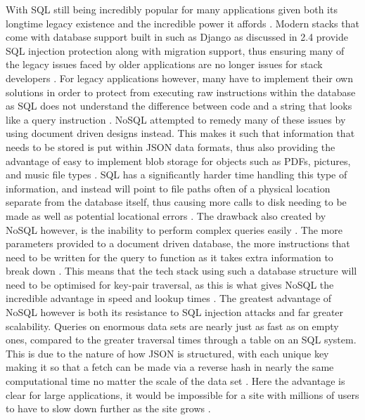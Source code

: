 With SQL still being incredibly popular for many applications given both its longtime legacy existence and the incredible power it affords \cite{Li_Manoharan_2013}. Modern stacks that come with database support built in such as Django as discussed in 2.4 provide SQL injection protection along with migration support, thus ensuring many of the legacy issues faced by older applications are no longer issues for stack developers \cite{Li_Manoharan_2013, Chen_Tang_Wang_Zhao_Guo_2016}. For legacy applications however, many have to implement their own solutions in order to protect from executing raw instructions within the database as SQL does not understand the difference between code and a string that looks like a query instruction \cite{Li_Manoharan_2013}.
\newline
\newline
NoSQL attempted to remedy many of these issues by using document driven designs instead. This makes it such that information that needs to be stored is put within JSON data formats, thus also providing the advantage of easy to implement blob storage for objects such as PDFs, pictures, and music file types \cite{Li_Manoharan_2013}. SQL has a significantly harder time handling this type of information, and instead will point to file paths often of a physical location separate from the database itself, thus causing more calls to disk needing to be made as well as potential locational errors \cite{Li_Manoharan_2013}. The drawback also created by NoSQL however, is the inability to perform complex queries easily \cite{Li_Manoharan_2013}. The more parameters provided to a document driven database, the more instructions that need to be written for the query to function as it takes extra information to break down \cite{Li_Manoharan_2013}. This means that the tech stack using such a database structure will need to be optimised for key-pair traversal, as this is what gives NoSQL the incredible advantage in speed and lookup times \cite{Li_Manoharan_2013}.
\newline
\newline
The greatest advantage of NoSQL however is both its resistance to SQL injection attacks and far greater scalability. Queries on enormous data sets are nearly just as fast as on empty ones, compared to the greater traversal times through a table on an SQL system. This is due to the nature of how JSON is structured, with each unique key making it so that a fetch can be made via a reverse hash in nearly the same computational time no matter the scale of the data set \cite{Li_Manoharan_2013}. Here the advantage is clear for large applications, it would be impossible for a site with millions of users to have to slow down further as the site grows \cite{Li_Manoharan_2013}.

